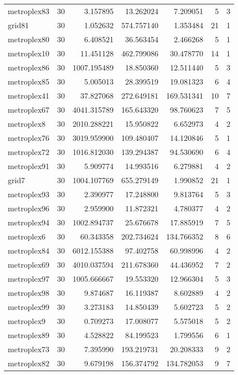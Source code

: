 \begin{longtable}{|l|r|r|r|r|r|r|}
metroplex83 & 30 & 3.157895 & 13.262024 & 7.209051 & 5 & 3 \\
grid81 & 30 & 1.052632 & 574.757140 & 1.353484 & 21 & 1 \\
metroplex80 & 30 & 6.408521 & 36.563454 & 2.466268 & 5 & 1 \\
metroplex10 & 30 & 11.451128 & 462.799086 & 30.478770 & 14 & 1 \\
metroplex86 & 30 & 1007.195489 & 18.850360 & 12.511440 & 5 & 3 \\
metroplex85 & 30 & 5.005013 & 28.399519 & 19.081323 & 6 & 4 \\
metroplex41 & 30 & 37.827068 & 272.649181 & 169.531341 & 10 & 7 \\
metroplex67 & 30 & 4041.315789 & 165.643320 & 98.760623 & 7 & 5 \\
metroplex8 & 30 & 2010.288221 & 15.950822 & 6.652973 & 4 & 2 \\
metroplex76 & 30 & 3019.959900 & 109.480407 & 14.120846 & 5 & 1 \\
metroplex72 & 30 & 1016.812030 & 139.294387 & 94.530690 & 6 & 4 \\
metroplex91 & 30 & 5.909774 & 14.993516 & 6.279881 & 4 & 2 \\
grid7 & 30 & 1004.107769 & 655.279149 & 1.990852 & 21 & 1 \\
metroplex93 & 30 & 2.390977 & 17.248800 & 9.813764 & 5 & 3 \\
metroplex96 & 30 & 2.959900 & 11.872321 & 4.780377 & 4 & 2 \\
metroplex94 & 30 & 1002.894737 & 25.676678 & 17.885919 & 7 & 5 \\
metroplex6 & 30 & 60.343358 & 202.734624 & 134.766352 & 8 & 6 \\
metroplex84 & 30 & 6012.155388 & 97.402758 & 60.998996 & 4 & 2 \\
metroplex69 & 30 & 4010.037594 & 211.678360 & 44.436952 & 7 & 2 \\
metroplex97 & 30 & 1005.666667 & 19.553320 & 12.966304 & 5 & 3 \\
metroplex98 & 30 & 9.874687 & 16.119387 & 8.602889 & 4 & 2 \\
metroplex99 & 30 & 3.273183 & 14.850439 & 5.602723 & 5 & 2 \\
metroplex9 & 30 & 0.709273 & 17.008077 & 5.575018 & 5 & 2 \\
metroplex89 & 30 & 4.528822 & 84.199523 & 1.799556 & 6 & 1 \\
metroplex73 & 30 & 7.395990 & 193.219731 & 20.208333 & 9 & 2 \\
metroplex82 & 30 & 9.679198 & 156.374792 & 134.782053 & 9 & 7 \\

\end{longtable}
